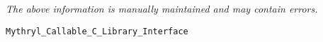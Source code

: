 \label{pkg:mythryl\_callable\_c\_library\_interface}

{\tiny \it The above information is manually maintained and may contain errors.}
\begin{verbatim}
Mythryl_Callable_C_Library_Interface
\end{verbatim}
